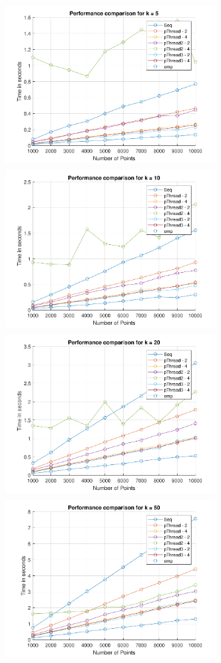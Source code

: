 \documentclass[a4paper, 11pt]{article}
\begin{document}
\begin{figure}[H]
    \centering
    \includegraphics[width=7.8cm,height=6cm]{k5}
    \includegraphics[width=7.8cm,height=6cm]{k10} \\
    \includegraphics[width=7.8cm,height=6cm]{k20}
    \includegraphics[width=7.8cm,height=6cm]{k50} \\

\end{figure}
\end{document}
